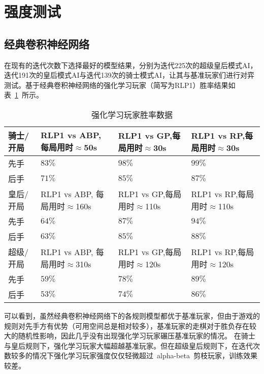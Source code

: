 \section{强度测试}

\subsection{经典卷积神经网络}
在现有的迭代次数下选择最好的模型结果，分别为迭代225次的超级皇后模式AI，迭代191次的皇后模式AI与迭代139次的骑士模式AI，让其与基准玩家们进行对弈测试。基于经典卷积神经网络的强化学习玩家（简写为RLP1）胜率结果如表~\ref{table:airesult}~所示。
\begin{table}[H]
    \centering
    \caption[airesult]{强化学习玩家胜率数据}
    \begin{tabular}{p{2cm}<{\centering} p{4cm}<{\centering} p{4cm}<{\centering} p{4cm}<{\centering}}
    \hline
    骑士/开局 & RLP1 vs ABP, 每局用时$\approx$50s & RLP1 vs GP,每局用时$\approx$30s & RLP1 vs RP,每局用时$\approx$30s \\ \hline
    先手 & $83\%$ & $98\%$ & $99\%$\\ 
    后手 & $71\%$ & $85\%$ & $87\%$\\ \hline
    皇后/开局 & RLP1 vs ABP, 每局用时$\approx$160s & RLP1 vs GP,每局用时$\approx$110s & RLP1 vs RP,每局用时$\approx$110s \\ \hline
    先手 & $64\%$ & $87\%$ & $94\%$\\ 
    后手 & $63\%$ & $85\%$ & $88\%$\\ \hline
    超级/开局 & RLP1 vs ABP, 每局用时$\approx$310s & RLP1 vs GP,每局用时$\approx$120s & RLP1 vs RP,每局用时$\approx$120s \\ \hline
    先手 & $59\%$ & $78\%$ & $89\%$\\ 
    后手 & $53\%$ & $74\%$ & $86\%$\\ \hline
    \end{tabular}
    \label{table:airesult}
  \end{table}
可以看到，虽然经典卷积神经网络下的各规则模型都优于基准玩家，但由于游戏的规则对先手方有优势（可用空间总是相对较多），基准玩家的走棋对于胜负存在较大的随机性影响，因此几乎没有出现强化学习玩家碾压基准玩家的情况。
在骑士与皇后规则下，强化学习玩家大幅超越基准玩家。但在超级皇后规则下，在迭代次数较多的情况下强化学习玩家强度仅仅轻微超过~alpha-beta~剪枝玩家，训练效果较差。
